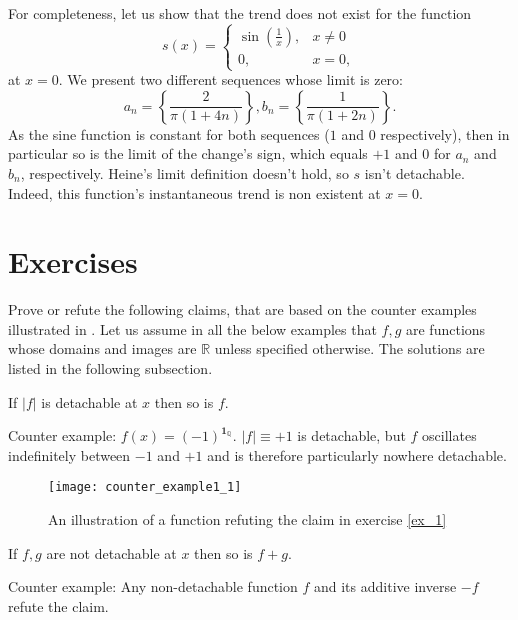 \documentclass[11pt]{book}
\begin{document}
\begin{remark}For completeness, let us show that the trend does not exist for the function $$s\left(x\right)=\begin{cases}
\sin\left(\frac{1}{x}\right), & x\neq0\\
0, & x=0,
\end{cases}$$
at $x=0$. We present two different sequences whose limit is zero: $$a_{n}=\left\{ \frac{2}{\pi\left(1+4n\right)}\right\} ,b_{n}=\left\{ \frac{1}{\pi\left(1+2n\right)}\right\}.$$
As the sine function is constant for both sequences ($1$ and $0$ respectively), then in particular so is the limit of the change’s sign, which equals $+1$ and $0$ for $a_{n}$ and $b_{n}$, respectively. Heine’s limit definition doesn’t hold, so $s$ isn’t detachable. Indeed, this function’s instantaneous trend is non existent at $x=0$.
\end{remark}

\section{Exercises}
Prove or refute the following claims, that are based on
the counter examples illustrated in \cite{klymchuk2010counterexamples}. Let us assume in all the below
examples that $f,g$ are functions whose domains and images are $\mathbb{R}$
unless specified otherwise. The solutions are listed in the following
subsection.

\begin{exercise}\label{ex_1}
If $\left|f\right|$ is detachable at $x$ then so is $f$.
\end{exercise}

Counter example: $f\left(x\right)=\left(-1\right)^{\boldsymbol{1}_{\mathbb{Q}}}$.
$\left|f\right|\equiv+1$ is detachable, but $f$ oscillates indefinitely
between $-1$ and $+1$ and is therefore particularly nowhere detachable.

\begin{figure}[h!]
\texttt{[image: counter\_example1\_1]}
\caption{An illustration of a function refuting the claim in exercise \ref{ex_1}}
\label{minus_one_in_irrationals}
\end{figure}

\begin{exercise}If $f,g$ are not detachable at $x$ then so is $f+g$.
\end{exercise}

Counter example: Any non-detachable function $f$ and its additive
inverse $-f$ refute the claim.
\end{document}
